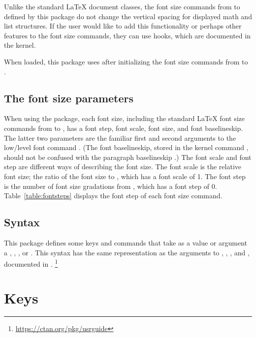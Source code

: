 \documentclass{beery}
\begin{document}
Unlike the standard \LaTeX{} document classes, the font size commands from  to  defined by this package do not change the vertical spacing for displayed math and list structures.
If the user would like to add this functionality or perhaps other features to the font size commands, they can use hooks, which are documented in the \LaTeXe{} kernel.

When loaded, this package uses  after initializing the font size commands from  to .

\subsection{The font size parameters}
\label{subsec:fontsizeparameters}

When using the  package, each font size, including the standard \LaTeX{} font size commands from  to , has a font step, font scale, font size, and font baselineskip.
The latter two parameters are the familiar first and second arguments to the low\-/level font command .
(The font baselineskip, stored in the kernel command , should not be confused with the paragraph baselineskip .)
The font scale and font step are different ways of describing the font size.
The font scale is the relative font size; the ratio of the font size to , which has a font scale of \num{1}.
The font step is the number of font size gradations from , which has a font step of \num{0}.
Table~\ref{table:fontsteps} displays the font step of each font size command.



\subsection{Syntax}
\label{subsec:syntax}

This package defines some keys and commands that take as a value or argument a , , , or .
This syntax has the same representation as the arguments to , , , and , documented in .%
\footnote{\url{https://ctan.org/pkg/usrguide}}


\section{Keys}
\label{sec:keys}
\end{document}
